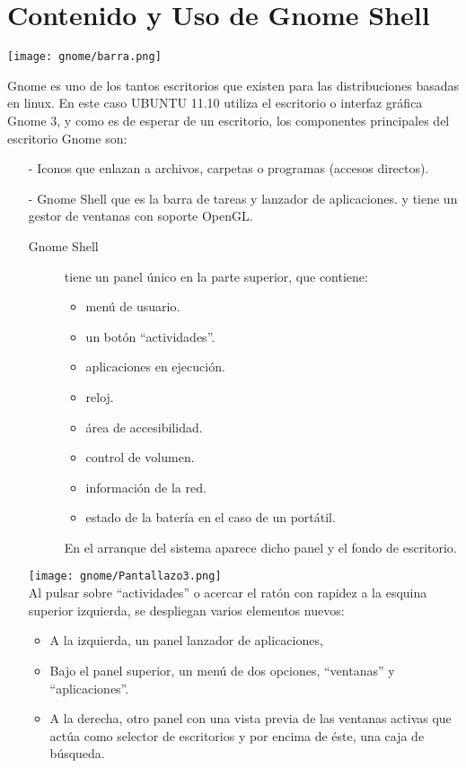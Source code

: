 \chapter{Contenido y Uso de Gnome Shell}
\begin{center}
\texttt{[image: gnome/barra.png]}
\end{center}
Gnome es uno de los tantos escritorios que existen para las distribuciones basadas en linux.
En este caso UBUNTU 11.10 utiliza el escritorio o interfaz gráfica Gnome 3, y como es de esperar de un escritorio, los componentes principales del escritorio Gnome son:
\begin{itemize}
\item[-] Iconos que enlazan a archivos, carpetas o programas (accesos directos).
\item[-] Gnome Shell que es la barra de tareas y lanzador de aplicaciones. y tiene un gestor de ventanas con soporte OpenGL.
\begin{description}
\item[Gnome Shell] tiene un panel único en la parte superior, que contiene:
\begin{itemize}
 \item menú de usuario. 
 \item un botón “actividades”. 
 \item aplicaciones en ejecución.
 \item reloj.
 \item área de accesibilidad.
 \item control de volumen.
 \item información de la red.
 \item estado de la batería en el caso de un portátil.
\end{itemize}
En el arranque del sistema aparece dicho panel y el fondo de escritorio.
\end{description}
\texttt{[image: gnome/Pantallazo3.png]}\\ 
Al pulsar sobre “actividades” o acercar el ratón con rapidez a la esquina superior izquierda, se despliegan varios elementos nuevos:
\begin{itemize}
\item A la izquierda, un panel lanzador de aplicaciones,
\item Bajo el panel superior, un menú de dos opciones, “ventanas” y “aplicaciones”.
\item A la derecha, otro panel con una vista previa de las ventanas activas que actúa como selector de escritorios y por encima de éste, una caja de búsqueda.

\end{itemize}
\end{itemize}

